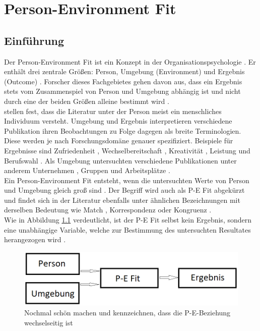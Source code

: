 \chapter{Person-Environment Fit}
\label{ch:personEnvironmentFit}

\section{Einführung}
\label{ch:personEnvironmentFit:einfuehrung}
Der Person-Environment Fit ist ein Konzept in der Organisationspsychologie \cite[S. 1f.]{edwards:2008}. Er enthält drei zentrale Größen: Person, Umgebung (Environment) und Ergebnis (Outcome) \cite[S. 2f.]{livingstone:1997}. Forscher dieses Fachgebietes gehen davon aus, dass ein Ergebnis stets vom Zusammenspiel von Person und Umgebung abhängig ist und nicht durch eine der beiden Größen alleine bestimmt wird \cite[S. 1]{muchinsky:1987}.\\
\textcite[S. 5]{edwards:2007} stellen fest, dass die Literatur unter der Person meist ein menschliches Individuum versteht. Umgebung und Ergebnis interpretieren verschiedene Publikation ihren Beobachtungen zu Folge dagegen als breite Terminologien. Diese werden je nach Forschungsdomäne genauer spezifiziert. Beispiele für Ergebnisse sind Zufriedenheit \cite[S. 1]{lashani:2021}, Wechselbereitschaft \cite[S. 1]{amarneh:2021}, Kreativität \cite[S. 1]{duan:2019}, Leistung \cite[S. 7f.]{elfenbein:2007} und  Berufswahl \cite[S. 1]{cable:1996}. Als Umgebung untersuchten verschiedene Publikationen unter anderem Unternehmen \cite[S. 1]{kristof:1996}, Gruppen \cite[S. 1]{werbel:2001} und Arbeitsplätze \cite[S. 1]{lu:2014}.\\
Ein Person-Environment Fit entsteht, wenn die untersuchten Werte von Person und Umgebung gleich groß sind \cite[S. 53]{edwards:2008}. Der Begriff wird auch als P-E Fit abgekürzt \cite[S. 428]{dawis:2002} und findet sich in der Literatur ebenfalls unter ähnlichen Bezeichnungen mit derselben Bedeutung wie Match \cite[S. 2]{player:2017}, Korrespondenz \cite[S. 1]{eggerth:2008} oder Kongruenz \cite[S. 1]{muchinsky:1987}.\\
Wie in Abbildung \ref{fig:personEnvironmentFit:einfuehrung:abb1} verdeutlicht, ist der P-E Fit selbst kein Ergebnis, sondern eine unabhängige Variable, welche zur Bestimmung des untersuchten Resultates herangezogen wird \cite[S. 4f.]{edwards:1991}.\\
\begin{figure}[h]
	\centering
	\includegraphics[width=1\textwidth]{gfx/P-E Fit.png}
	\caption{Nochmal schön machen und kennzeichnen, dass die P-E-Beziehung wechselseitig ist}
	\label{fig:personEnvironmentFit:einfuehrung:abb1}
\end{figure}
